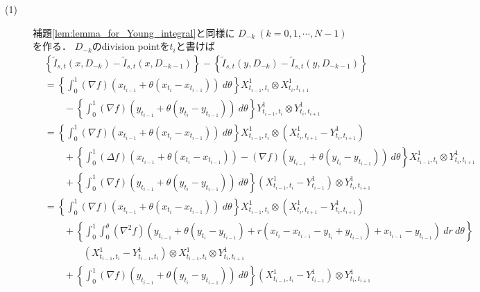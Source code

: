 	\begin{prf}\mbox{}
		\begin{description}
			\item[(1)] 
				補題\ref{lem:lemma_for_Young_integral}と同様に
				$D_{-k}\ (k=0,1,\cdots,N-1)$を作る．
				$D_{-k}$のdivision pointを$t_i$と書けば
				\begin{align}
					&\left\{ \tilde{I}_{s,t}(x,D_{-k}) - \tilde{I}_{s,t}(x,D_{-k-1}) \right\}
					- \left\{ \tilde{I}_{s,t}(y,D_{-k}) - \tilde{I}_{s,t}(y,D_{-k-1}) \right\} \\
					&= \left\{ \int_0^1 (\nabla f)(x_{t_{i-1}} + \theta (x_{t_i} - x_{t_{i-1}}))\ d\theta \right\} X^1_{t_{i-1},t_i} \otimes X^1_{t_i,t_{i+1}} \\
						&\qquad - \left\{ \int_0^1 (\nabla f)(y_{t_{i-1}} + \theta (y_{t_i} - y_{t_{i-1}}))\ d\theta \right\} Y^1_{t_{i-1},t_i} \otimes Y^1_{t_i,t_{i+1}} \\
					&= \left\{ \int_0^1 (\nabla f)(x_{t_{i-1}} + \theta (x_{t_i} - x_{t_{i-1}}))\ d\theta \right\} X^1_{t_{i-1},t_i} \otimes \left( X^1_{t_i,t_{i+1}} -  Y^1_{t_i,t_{i+1}}\right) \\
						&\qquad+ \left\{ \int_0^1 (\Delta f)\left( x_{t_{i-1}} + \theta(x_{t_i} - x_{t_{i-1}}) \right)
							- (\nabla f)\left( y_{t_{i-1}} + \theta(y_{t_i} - y_{t_{i-1}}) \right)\ d\theta \right\} X^1_{t_{i-1},t_i} \otimes Y^1_{t_i,t_{i+1}} \\
						&\qquad + \left\{ \int_0^1 (\nabla f)(y_{t_{i-1}} + \theta (y_{t_i} - y_{t_{i-1}}))\ d\theta \right\} \left( X^1_{t_{i-1},t_i} - Y^1_{t_{i-1}} \right) \otimes Y^1_{t_i,t_{i+1}} \\
					&= \left\{ \int_0^1 (\nabla f)(x_{t_{i-1}} + \theta (x_{t_i} - x_{t_{i-1}}))\ d\theta \right\} X^1_{t_{i-1},t_i} \otimes \left( X^1_{t_i,t_{i+1}} -  Y^1_{t_i,t_{i+1}}\right) \\
						&\qquad+ \left\{ \int_0^1 \int_0^\theta (\nabla^2 f)\left( y_{t_{i-1}} + \theta(y_{t_i} - y_{t_{i-1}})
							 + r\left( x_{t_i} - x_{t_{i-1}} - y_{t_i} + y_{t_{i-1}} \right) + x_{t_{i-1}} - y_{t_{i-1}} \right)\ dr\ d\theta \right\} \\
							 &\qquad \qquad \left( X^1_{t_{i-1},t_i} - Y^1_{t_{i-1},t_i} \right) \otimes X^1_{t_{i-1},t_i} \otimes Y^1_{t_i,t_{i+1}} \\
						&\qquad + \left\{ \int_0^1 (\nabla f)(y_{t_{i-1}} + \theta (y_{t_i} - y_{t_{i-1}}))\ d\theta \right\} \left( X^1_{t_{i-1},t_i} - Y^1_{t_{i-1}} \right) \otimes Y^1_{t_i,t_{i+1}}
				\end{align}

\end{description}
\end{prf}

